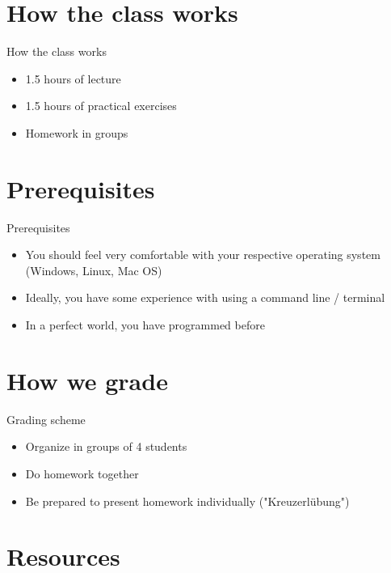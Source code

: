 \documentclass[10pt,color=usenames,dvipsnames]{beamer}
\begin{document}
\section{How the class works}

\begin{frame}{How the class works}
	
	\begin{itemize}
		\item 1.5 hours of lecture
		\item 1.5 hours of practical exercises
		\item Homework in groups
	\end{itemize}	

\end{frame}

\section{Prerequisites}

\begin{frame}{Prerequisites}
	
	\begin{itemize}
		\item You should feel very comfortable with your respective operating system (Windows, Linux, Mac OS)
		\item Ideally, you have some experience with using a command line / terminal
		\item In a perfect world, you have programmed before
	\end{itemize}
	
\end{frame}


\section{How we grade}

\begin{frame}{Grading scheme}

	\begin{itemize}
		\item Organize in groups of 4 students	
		\item Do homework together
		\item Be prepared to present homework individually ("Kreuzerlübung")		
	\end{itemize}

\end{frame}

\section{Resources}
\end{document}
